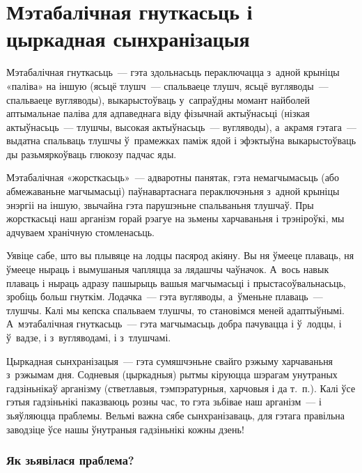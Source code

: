 \chapter[Мэтабалічная гнуткасьць і цыркадная сынхранізацыя][Мэтабалічная гнуткасьць]{Мэтабалічная гнуткасьць і цыркадная сынхранізацыя}

Мэтабалічная гнуткасьць~--- гэта здольнасьць пераключацца з~адной крыніцы «паліва» на іншую (ясьцё тлушч~--- спальваеце тлушч, ясьцё вугляводы~--- спальваеце вугляводы), выкарыстоўваць у~сапраўдны момант найболей аптымальнае паліва для адпаведнага віду фізычнай актыўнасьці (нізкая актыўнасьць~--- тлушчы, высокая актыўнасьць~--- вугляводы), а~акрамя гэтага~--- выдатна спальваць тлушчы ў~прамежках паміж ядой і эфэктыўна выкарыстоўваць ды разьмяркоўваць глюкозу падчас яды.

Мэтабалічная «жорсткасьць»~--- адваротны панятак, гэта немагчымасьць (або абмежаваньне магчымасьці) паўнавартаснага пераключэньня з~адной крыніцы энэргіі на іншую, звычайна гэта парушэньне спальваньня тлушчаў. Пры жорсткасьці наш арганізм горай рэагуе на зьмены харчаваньня і трэніроўкі, мы адчуваем хранічную стомленасьць.

Уявіце сабе, што вы плывяце на лодцы пасярод акіяну. Вы ня ўмееце плаваць, ня ўмееце ныраць і вымушаныя чапляцца за лядашчы чаўначок. А~вось навык плаваць і ныраць адразу пашырыць вашыя магчымасьці і прыстасоўвальнасьць, зробіць больш гнуткім. Лодачка~--- гэта вугляводы, а~ўменьне плаваць~--- тлушчы. Калі мы кепска спальваем тлушчы, то становімся меней адаптыўнымі. А~мэтабалічная гнуткасьць~--- гэта магчымасьць добра пачувацца і ў~лодцы, і ў~вадзе, і з~вугляводамі, і з~тлушчамі.

Цыркадная сынхранізацыя~--- гэта сумяшчэньне свайго рэжыму харчаваньня з~рэжымам дня. Содневыя (цыркадныя) рытмы кіруюцца шэрагам унутраных гадзіньнікаў арганізму (стветлавыя, тэмпэратурныя, харчовыя і да т.~п.). Калі ўсе гэтыя гадзіньнікі паказваюць розны час, то гэта зьбівае наш арганізм~--- і зьяўляюцца праблемы. Вельмі важна сябе сынхранізаваць, для гэтага правільна заводзіце ўсе нашы ўнутраныя гадзіньнікі кожны дзень!


\subsection{Як зьявілася праблема?}

